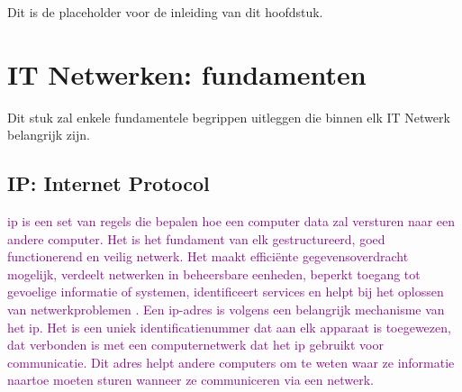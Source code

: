 Dit is de placeholder voor de inleiding van dit hoofdstuk.

\section{IT Netwerken: fundamenten}
Dit stuk zal enkele fundamentele begrippen uitleggen die binnen elk IT Netwerk belangrijk zijn.

\subsection{IP: Internet Protocol}
\textcolor{purple}{\acrfull{ip} is een set van regels die bepalen hoe een computer data zal versturen naar een andere computer. Het is het fundament van elk gestructureerd, goed functionerend en veilig netwerk. Het maakt efficiënte gegevensoverdracht mogelijk, verdeelt netwerken in beheersbare eenheden, beperkt toegang tot gevoelige informatie of systemen, identificeert services en helpt bij het oplossen van netwerkproblemen \autocite{Postel1981}. Een \acrshort{ip}-adres is volgens \textcite{Postel1981} een belangrijk mechanisme van het \acrshort{ip}. Het is een uniek identificatienummer dat aan elk apparaat is toegewezen, dat verbonden is met een computernetwerk dat het \acrshort{ip} gebruikt voor communicatie. Dit adres helpt andere computers om te weten waar ze informatie naartoe moeten sturen wanneer ze communiceren via een netwerk.}
